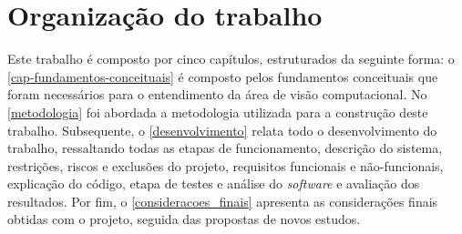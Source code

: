 \section{\textbf{Organização do trabalho}}

Este trabalho é composto por cinco capítulos, estruturados da seguinte forma: o \autoref{cap-fundamentos-conceituais} é composto pelos fundamentos conceituais que foram necessários para o entendimento da área de visão computacional. No \autoref{metodologia} foi abordada a metodologia utilizada para a construção deste trabalho.  Subsequente, o \autoref{desenvolvimento} relata todo o desenvolvimento do trabalho, ressaltando todas as etapas de funcionamento, descrição do sistema,  restrições, riscos e exclusões do projeto, requisitos funcionais e não-funcionais, explicação do código, etapa de testes e análise do \textit{software} e avaliação dos resultados. Por fim, o \autoref{consideracoes_finais} apresenta as considerações finais obtidas com o projeto, seguida das propostas de novos estudos.